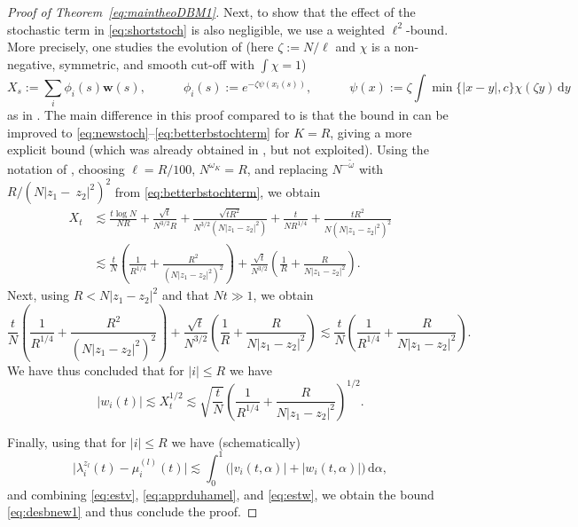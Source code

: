 \documentclass[10pt]{amsart}
\numberwithin{equation}{section}
\newcommand{\dif}{\mathrm{d}}
\begin{document}
\begin{proof}[Proof of Theorem~\ref{eq:maintheoDBM1}]
Next, to show that the effect of the stochastic term in \eqref{eq:shortstoch} is also negligible, we use a weighted $\ell^2$-bound. More precisely, one studies the evolution of (here $\zeta:=N/\ell$ and $\chi$ is a non-negative, symmetric, and smooth cut-off with $\int\chi=1$)
\begin{equation}
X_s:=\sum_i \phi_i(s){\bm w}(s), \qquad\quad \phi_i(s):=e^{-\zeta\psi(x_i(s))}, \qquad\quad \psi(x):=\zeta\int \min\{|x-y|, c\}\chi(\zeta y)\,\dif y
\end{equation}
as in \cite[Lemma~4.13]{bourgade2024fluctuations}. The main difference in this proof compared to \cite[Lemma~4.13]{bourgade2024fluctuations} is that the bound in \cite[Assumption~4.2]{bourgade2024fluctuations} can be improved to \eqref{eq:newstoch}--\eqref{eq:betterbstochterm} for $K=R$, giving a more explicit bound (which was already obtained in \cite{bourgade2024fluctuations}, but not exploited). Using the notation of \cite[Lemma~4.13]{bourgade2024fluctuations}, choosing $\ell=R/100$, $N^{\omega_K}=R$, and replacing $N^{-\tilde{\omega}}$ with $R/(N|z_1-~\!z_2|^2)^2$ from \eqref{eq:betterbstochterm}, we obtain
\begin{equation}
\begin{split}
X_t&\lesssim \frac{t\log N}{NR}+\frac{\sqrt{t}}{N^{3/2}R}+\frac{\sqrt{t R^2}}{N^{3/2} (N|z_1-z_2|^2)}+\frac{t}{N R^{1/4}}+\frac{t R^2}{N(N|z_1-z_2|^2)^2} \\
&\lesssim\frac{t}{N}\left(\frac{1}{R^{1/4}}+\frac{R^2}{(N|z_1-z_2|^2)^2}\right)+\frac{\sqrt{t}}{N^{3/2}}\left(\frac{1}{R}+\frac{R}{N|z_1-z_2|^2}\right).
\end{split}
\end{equation}
Next, using $R<N|z_1-z_2|^2$ and that $Nt\gg 1$, we obtain
\begin{equation}
\frac{t}{N}\left(\frac{1}{R^{1/4}}+\frac{R^2}{(N|z_1-z_2|^2)^2}\right)+\frac{\sqrt{t}}{N^{3/2}}\left(\frac{1}{R}+\frac{R}{N|z_1-z_2|^2}\right)\lesssim \frac{t}{N}\left(\frac{1}{R^{1/4}}+\frac{R}{N|z_1-z_2|^2}\right).
\end{equation}
We have thus concluded that for $|i|\le R$ we have
\begin{equation}
\label{eq:estw}
|w_i(t)|\lesssim X_t^{1/2}\lesssim \sqrt{\frac{t}{N}}\left(\frac{1}{R^{1/4}}+\frac{R}{N|z_1-z_2|^2}\right)^{1/2}.
\end{equation}

Finally, using that for $|i|\le R$ we have (schematically)
\begin{equation}
\big|\lambda_i^{z_l}(t)-\mu_i^{(l)}(t)\big|\lesssim \int_0^1\big(|v_i(t,\alpha)|+|w_i(t,\alpha)|\big)\,\dif \alpha,
\end{equation}
and combining \eqref{eq:estv}, \eqref{eq:apprduhamel}, and \eqref{eq:estw}, we obtain the bound \eqref{eq:desbnew1} and thus conclude the proof.
\end{proof}
\end{document}
